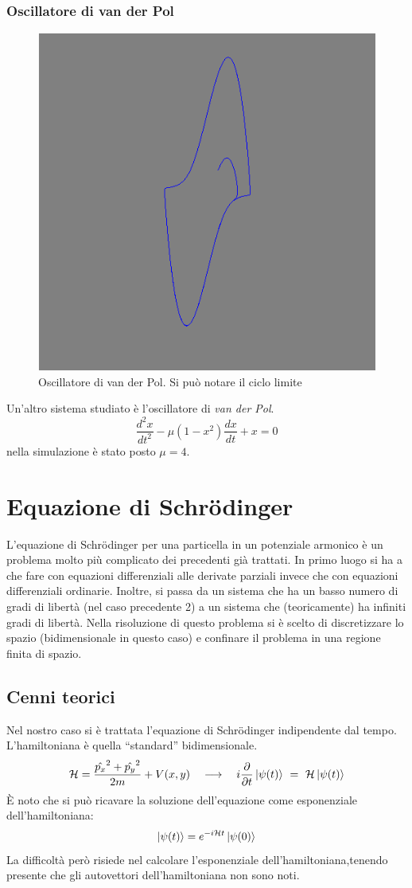 \subsubsection{Oscillatore di van der Pol}
\begin{figure}[!h]
  \centering
  \includegraphics[width = 0.6\columnwidth]{van_der_pol.png}
  \caption{Oscillatore di van der Pol. Si può notare il ciclo limite}
\end{figure}

Un'altro sistema studiato è l'oscillatore di \emph{van der Pol}.
$$
\frac{d^2x}{dt^2}-\mu(1-x^2)\frac{dx}{dt}+x = 0
$$
nella simulazione è stato posto $\mu = 4$.
\pagebreak
\section{Equazione di Schr\"{o}dinger}
L'equazione di Schr\"{o}dinger per una particella in un potenziale armonico è un problema molto più complicato dei precedenti già trattati.
In primo luogo si ha a che fare con equazioni differenziali alle derivate parziali invece che con equazioni differenziali ordinarie.
Inoltre, si passa da un sistema che ha un basso numero di gradi di libertà (nel caso precedente 2) a un sistema che (teoricamente) ha infiniti gradi di libertà.
Nella risoluzione di questo problema si è scelto di discretizzare lo spazio (bidimensionale in questo caso) e confinare il problema in una regione finita di spazio.
\subsection{Cenni teorici}
Nel nostro caso si è trattata l'equazione di Schr\"odinger indipendente dal tempo. L'hamiltoniana è quella ``standard'' bidimensionale.
$$
\mathcal{H} = \frac{\hat{p_x}^2+\hat{p_y}^2}{2m} + V(x,y) \quad \longrightarrow \quad i \p{}{t}\ket{\psi(t)} \ = \ \mathcal{H} \ket{\psi(t)}
$$
È noto che si può ricavare la soluzione dell'equazione come esponenziale dell'hamiltoniana:
$$
\left| \psi(t) \right> = e^{ -i \mathcal{H} t} \left| \psi(0) \right>
$$
La difficoltà però risiede nel calcolare l'esponenziale dell'hamiltoniana,tenendo presente che gli autovettori dell'hamiltoniana non sono noti.
